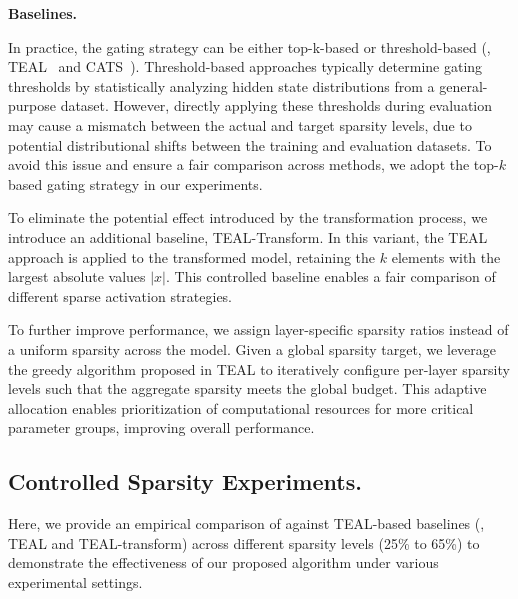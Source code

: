 \textbf{Baselines.} {In practice, the gating strategy can be either top-k-based or threshold-based (\eg, TEAL~\citep{liu2024trainingfreeactivationsparsitylarge} and CATS~\citep{lee2024catscontextuallyawarethresholdingsparsity}). Threshold-based approaches typically determine gating thresholds by statistically analyzing hidden state distributions from a general-purpose dataset. However, directly applying these thresholds during evaluation may cause a mismatch between the actual and target sparsity levels, due to potential distributional shifts between the training and evaluation datasets. To avoid this issue and ensure a fair comparison across methods, we adopt the top-$k$ based gating strategy in our experiments. 

To eliminate the potential effect introduced by the transformation process, we introduce an additional baseline, TEAL-Transform. In this variant, the TEAL approach is applied to the transformed model, retaining the $k$ elements with the largest absolute values $|x|$. This controlled baseline enables a fair comparison of different sparse activation strategies.

To further improve performance, we assign layer-specific sparsity ratios instead of a uniform sparsity across the model. Given a global sparsity target, we leverage the greedy algorithm proposed in TEAL to iteratively configure per-layer sparsity levels such that the aggregate sparsity meets the global budget. This adaptive allocation enables prioritization of computational resources for more critical parameter groups, improving overall performance.


\subsection{Controlled Sparsity Experiments.}
Here, we provide an empirical comparison of \algacro{} against TEAL-based baselines (\eg, TEAL and TEAL-transform) across different sparsity levels (25\% to 65\%) to demonstrate the effectiveness of our proposed algorithm under various experimental settings.

}
